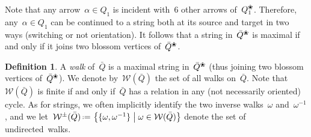 \documentclass{amsart}
\theoremstyle{definition}
\newtheorem{definition}[theorem]{Definition}
\newcommand{\set}[2]{\left\{ #1 \;\middle|\; #2 \right\}} %
\newcommand{\eqdef}{\mbox{\,\raisebox{0.2ex}{\scriptsize\ensuremath{\mathrm:}}\ensuremath{=}\,}} %
\newcommand{\darkblue}{\color{darkblue}} %
\newcommand{\defn}[1]{\textsl{\darkblue #1}} %
\newcommand{\blossom}{^\text{\ding{96}}} %
\newcommand{\walks}{\mathcal{W}} %
\begin{document}
%

Note that any arrow~$\alpha \in Q_1$ is incident with~$6$ other arrows of~$Q\blossom_1$.
Therefore, any~$\alpha \in Q_1$ can be continued to a string both at its source and target in two ways (switching or not orientation).
It follows that a string in~$\bar Q\blossom$ is maximal if and only if it joins two blossom vertices of~$\bar Q\blossom$.

\begin{definition}
A \defn{walk} of~$\bar Q$ is a maximal string in~$\bar Q\blossom$ (thus joining two blossom vertices of~$\bar Q\blossom$).
We denote by~$\walks(\bar Q)$ the set of all walks on~$\bar Q$.
Note that~$\walks(\bar Q)$ is finite if and only if~$\bar Q$ has a relation in any (not necessarily oriented) cycle.
As for strings, we often implicitly identify the two inverse walks~$\omega$ and~$\omega^{-1}$, and we let~$\walks^\pm(\bar Q) \eqdef \set{\{\omega, \omega^{-1}\}}{\omega \in \walks(\bar Q)}$ denote the set of undirected~walks.
\end{definition}
\end{document}
